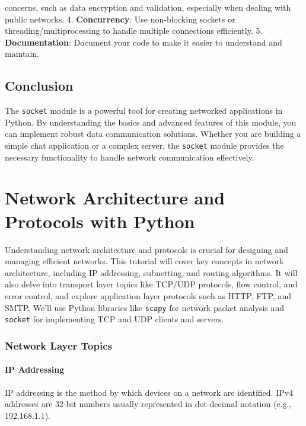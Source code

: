 \documentclass[
  letterpaper,
  DIV=11,
  numbers=noendperiod]{scrreprt}
\begin{document}
concerns, such as data encryption and validation, especially when
dealing with public networks. 4. \textbf{Concurrency}: Use non-blocking
sockets or threading/multiprocessing to handle multiple connections
efficiently. 5. \textbf{Documentation}: Document your code to make it
easier to understand and maintain.

\section{Conclusion}\label{conclusion-31}

The \texttt{socket} module is a powerful tool for creating networked
applications in Python. By understanding the basics and advanced
features of this module, you can implement robust data communication
solutions. Whether you are building a simple chat application or a
complex server, the \texttt{socket} module provides the necessary
functionality to handle network communication effectively.


\chapter{Network Architecture and Protocols with
Python}\label{network-architecture-and-protocols-with-python}

Understanding network architecture and protocols is crucial for
designing and managing efficient networks. This tutorial will cover key
concepts in network architecture, including IP addressing, subnetting,
and routing algorithms. It will also delve into transport layer topics
like TCP/UDP protocols, flow control, and error control, and explore
application layer protocols such as HTTP, FTP, and SMTP. We'll use
Python libraries like \texttt{scapy} for network packet analysis and
\texttt{socket} for implementing TCP and UDP clients and servers.

\subsection{Network Layer Topics}\label{network-layer-topics}

\subsubsection{IP Addressing}\label{ip-addressing}

IP addressing is the method by which devices on a network are
identified. IPv4 addresses are 32-bit numbers usually represented in
dot-decimal notation (e.g., 192.168.1.1).
\end{document}
